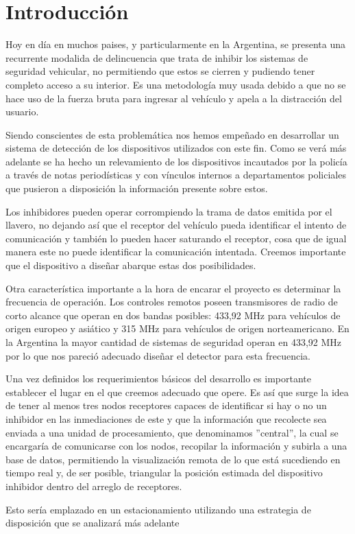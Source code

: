 \documentclass[12pt]{report}
\begin{document}
\chapter{Introducción}
Hoy en día en muchos paises, y particularmente en la Argentina, se presenta una recurrente modalida de delincuencia que trata de 
inhibir los sistemas de seguridad vehicular, no permitiendo que estos se cierren y pudiendo tener completo acceso a su interior. Es 
una metodología muy usada debido a que no se hace uso de la fuerza bruta para ingresar al vehículo y apela a la distracción del usuario.\par
Siendo conscientes de esta problemática nos hemos empeñado en desarrollar un sistema de detección de los dispositivos utilizados
con este fin. Como se verá más adelante se ha hecho un relevamiento de los dispositivos incautados por la policía a través de notas
periodísticas y con vínculos internos a departamentos policiales que pusieron a disposición la información presente sobre estos.\par
Los inhibidores pueden operar corrompiendo la trama de datos emitida por el llavero, no dejando así que el receptor del vehículo 
pueda identificar el intento de comunicación y también lo pueden hacer saturando el receptor, cosa que de igual manera este no puede identificar
la comunicación intentada. Creemos importante que el dispositivo a diseñar abarque estas dos posibilidades. \par
Otra característica importante a la hora de encarar el proyecto es determinar la frecuencia de operación. Los controles remotos poseen transmisores
de radio de corto alcance que operan en dos bandas posibles: 433,92 MHz para vehículos de origen europeo y asiático y 315 MHz para vehículos de origen 
norteamericano. En la Argentina la mayor cantidad de sistemas de seguridad operan en 433,92 MHz por lo que nos pareció adecuado diseñar el
detector para esta frecuencia. \par
Una vez definidos los requerimientos básicos del desarrollo es importante establecer el lugar en el que creemos adecuado que opere. Es así
que surge la idea de tener al menos tres nodos receptores capaces de identificar si hay o no un inhibidor en las inmediaciones de este
y que la información que recolecte sea enviada a una unidad de procesamiento, que denominamos ''central'', la cual se encargaría de 
comunicarse con los nodos, recopilar la información y subirla a una base de datos, permitiendo la visualización remota de lo que está sucediendo 
en tiempo real y, de ser posible, triangular la posición estimada del dispositivo inhibidor dentro del arreglo de receptores.\par
Esto sería emplazado en un estacionamiento utilizando una estrategia de disposición que se analizará más adelante
\end{document}
